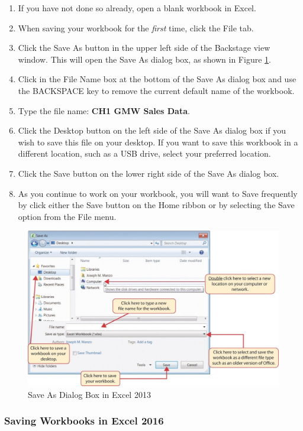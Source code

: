\begin{enumerate}
	\item If you have not done so already, open a blank workbook in Excel.
	\item When saving your workbook for the \textit{first} time, click the File tab.
	\item Click the Save As button in the upper left side of the Backstage view window. This will open the Save As dialog box, as shown in Figure \ref{01:fig11}.
	\item Click in the File Name box at the bottom of the Save As dialog box and use the BACKSPACE key to remove the current default name of the workbook.
	\item Type the file name: \textbf{CH1 GMW Sales Data}.
	\item Click the Desktop button on the left side of the Save As dialog box if you wish to save this file on your desktop. If you want to save this workbook in a different location, such as a USB drive, select your preferred location.
	\item Click the Save button on the lower right side of the Save As dialog box.
	\item As you continue to work on your workbook, you will want to Save frequently by click either the Save button on the Home ribbon or by selecting the Save option from the File menu.
\end{enumerate}

\begin{figure}[H]
	\centering
	\includegraphics[width=\maxwidth{.95\linewidth}]{gfx/Ch01_fig11}
	\caption{Save As Dialog Box in Excel 2013}
	\label{01:fig11}
\end{figure}

\subsubsection{Saving Workbooks in Excel 2016}

